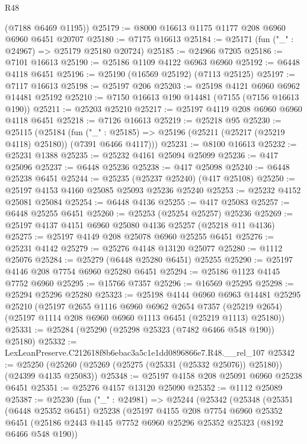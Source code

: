 \begin{lexlean}{R48}
\begin{coremodule}
      (@7188 @6469 @1195))
@25179 := @8000 @16613 @1175 @1177 @208 @6960 @6960 @6451 @20707
@25180 := @7175 @16613
@25184 := @25171 (fun ("_" : @24967) => @25179 @25180 @20724)
@25185 := @24966 @7205
@25186 := @7101 @16613
@25190 := @25186 @1109 @4122 @6963 @6960
@25192 := @6448 @4118 @6451
@25196 := @25190 (@16569 @25192) (@7113 @25125)
@25197 := @7117 @16613
@25198 := @25197 @206
@25203 := @25198 @4121 @6960 @6962 @14481 @25192
@25210 := @7150 @16613 @190 @14481 (@7155 (@7156 @16613 @190))
@25211 := @25203 @25210
@25217 := @25197 @4119 @208 @6960 @6960 @4118 @6451
@25218 := @7126 @16613
@25219 := @25218 @95
@25230 := @25115
    (@25184
      (fun ("_" : @25185) => @25196 (@25211 (@25217 (@25219 @4118) @25180)) (@7391 @6466 @4117)))
@25231 := @8100 @16613
@25232 := @25231 @1388
@25235 := @25232 @4161 @25094 @25099
@25236 := @417 @25096
@25237 := @6448 @25236
@25238 := @417 @25098
@25240 := @6448 @25238 @6451
@25244 := @25235 (@25237 @25240) (@417 @25108)
@25250 := @25197 @4153 @4160 @25085 @25093 @25236 @25240
@25253 := @25232 @4152 @25081 @25084
@25254 := @6448 @4136
@25255 := @417 @25083
@25257 := @6448 @25255 @6451
@25260 := @25253 (@25254 @25257) @25236
@25269 := @25197 @4137 @4151 @6960 @25080 @4136 @25257 (@25218 @11 @4136)
@25275 := @25197 @4149 @208 @25078 @6960 @25255 @6451
@25276 := @25231 @4142
@25279 := @25276 @4148 @13120 @25077
@25280 := @1112 @25076
@25284 := @25279 (@6448 @25280 @6451) @25255
@25290 := @25197 @4146 @208 @7754 @6960 @25280 @6451
@25294 := @25186 @1123 @4145 @7752 @6960
@25295 := @15766 @7357
@25296 := @16569 @25295
@25298 := @25294 @25296 @25280
@25323 := @25198
    @4144
    @6960
    @6963
    @14481
    @25295
    @25210
    (@25197
      @2655
      @1116
      @6960
      @6962
      @2654
      @7357
      (@25219 @2654)
      (@25197 @1114 @208 @6960 @6960 @1113 @6451 (@25219 @1113) @25180))
@25331 := @25284 (@25290 (@25298 @25323 (@7482 @6466 @548 @190)) @25180)
@25332 := LexLeanPreserve.C212618f8b6ebac3a5c1e1dd0896866e7.R48.__rel_107
@25342 := @25250 (@25260 (@25269 (@25275 (@25331 (@25332 @25076)) @25180)) (@24399 @4135 @25083))
@25348 := @25197 @4158 @208 @25091 @6960 @25238 @6451
@25351 := @25276 @4157 @13120 @25090
@25352 := @1112 @25089
@25387 := @25230
    (fun ("_" : @24981) =>
    @25244
      (@25342
        (@25348
          (@25351
            (@6448 @25352 @6451)
            @25238
            (@25197
              @4155
              @208
              @7754
              @6960
              @25352
              @6451
              (@25186 @2443 @4145 @7752 @6960 @25296 @25352 @25323 (@8192 @6466 @548 @190))

\end{coremodule}
\end{lexlean}
